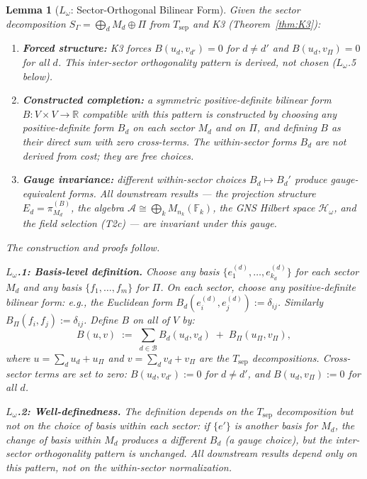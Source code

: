 \documentclass[11pt,a4paper]{article}
\newtheorem{lemma}[theorem]{Lemma}
\theoremstyle{definition}
\begin{document}
\begin{lemma}[$L_\omega$: Sector-Orthogonal Bilinear Form]\label{lem:Lomega}
Given the sector decomposition $S_\Gamma = \bigoplus_d M_d \oplus \Pi$ from $T_{\mathrm{sep}}$ and K3 (Theorem~\ref{thm:K3}):
\begin{enumerate}[nosep,label=(\alph*),leftmargin=2em]
\item \textbf{Forced structure:} K3 forces $B(u_d, v_{d'}) = 0$ for $d \ne d'$ and $B(u_d, v_\Pi) = 0$ for all $d$.  This inter-sector orthogonality pattern is derived, not chosen ($L_\omega$.5 below).
\item \textbf{Constructed completion:} a symmetric positive-definite bilinear form $B: V \times V \to \mathbb{R}$ compatible with this pattern is constructed by choosing any positive-definite form $B_d$ on each sector $M_d$ and on $\Pi$, and defining $B$ as their direct sum with zero cross-terms.  The within-sector forms $B_d$ are \emph{not} derived from cost; they are free choices.
\item \textbf{Gauge invariance:} different within-sector choices $B_d \mapsto B_d'$ produce gauge-equivalent forms.  All downstream results --- the projection structure $E_d = \pi_{M_d}^{(B)}$, the algebra $\mathcal{A} \cong \bigoplus_k M_{n_k}(\mathbb{F}_k)$, the GNS Hilbert space $\mathcal{H}_\omega$, and the field selection (T2c) --- are invariant under this gauge.
\end{enumerate}
The construction and proofs follow.

\medskip\noindent
\textbf{$L_\omega$.1: Basis-level definition.}
Choose any basis $\{e_1^{(d)}, \ldots, e_{k_d}^{(d)}\}$ for each sector $M_d$ and any basis $\{f_1, \ldots, f_m\}$ for $\Pi$.  On each sector, choose any positive-definite bilinear form: e.g., the Euclidean form $B_d(e_i^{(d)}, e_j^{(d)}) := \delta_{ij}$.  Similarly $B_\Pi(f_i, f_j) := \delta_{ij}$.  Define $B$ on all of $V$ by:
\[
B(u, v) \;:=\; \sum_{d \in \mathcal{B}} B_d(u_d, v_d) \;+\; B_\Pi(u_\Pi, v_\Pi),
\]
where $u = \sum_d u_d + u_\Pi$ and $v = \sum_d v_d + v_\Pi$ are the $T_{\mathrm{sep}}$ decompositions.  Cross-sector terms are set to zero: $B(u_d, v_{d'}) := 0$ for $d \ne d'$, and $B(u_d, v_\Pi) := 0$ for all $d$.

\medskip\noindent
\textbf{$L_\omega$.2: Well-definedness.}
The definition depends on the $T_{\mathrm{sep}}$ decomposition but \emph{not} on the choice of basis within each sector: if $\{e'\}$ is another basis for $M_d$, the change of basis within $M_d$ produces a different $B_d$ (a gauge choice), but the inter-sector orthogonality pattern is unchanged.  All downstream results depend only on this pattern, not on the within-sector normalization.


\end{lemma}
\end{document}
